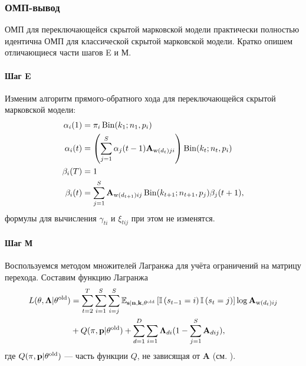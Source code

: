 \subsubsection{ОМП-вывод}

ОМП для переключающейся скрытой марковской модели практически полностью
идентична ОМП для классической скрытой марковской модели. Кратко опишем отличающиеся
части шагов E и М.

\paragraph{Шаг E}

Изменим алгоритм прямого-обратного хода для переключающейся скрытой
марковской модели:
\begin{align*}
  \alpha_i(1)
  &= \pi_i \operatorname{Bin}(k_1; n_1, p_i) \\
  \alpha_i(t)
  &= \left( \sum\limits_{j = 1}^S \alpha_j(t - 1) \mathbf{A}_{\operatorname{w}(d_t)ji}
     \right) \operatorname{Bin}(k_t; n_t, p_i) \\
  \beta_i(T)
  &= 1 \\
  \beta_i(t)
  &= \sum\limits_{j = 1}^S
     \mathbf{A}_{\operatorname{w}(d_{t+1})ij} \operatorname{Bin}(k_{t + 1}; n_{t + 1}, p_j) \beta_j(t + 1),
\end{align*}
формулы для вычисления $\gamma_{ti}$ и $\xi_{tij}$ при этом не изменятся.

\paragraph{Шаг М}

Воспользуемся методом множителей Лагранжа для учёта ограничений на матрицу перехода.
Составим функцию Лагранжа
\begin{align*}
  L(\mathbf{\theta}, \mathbf{\Lambda}|\mathbf{\theta}^{\operatorname{old}})
  &= \sum\limits_{t = 2}^T
     \sum\limits_{i = 1}^S \sum\limits_{i = j}^S
     \mathbb{E}_{\mathbf{s}|\mathbf{n}, \mathbf{k}, \mathbf{\theta}^{\operatorname{old}}} \left[ \mathbb{I}\left( s_{t - 1} = i \right)\mathbb{I}\left( s_t = j \right) \right] \log \mathbf{A}_{\operatorname{w}(d_t)ij} \\
  &+ Q(\mathbf{\pi}, \mathbf{p}|\mathbf{\theta}^{\operatorname{old}})
   + \sum\limits_{d = 1}^D \sum\limits_{i = 1}
     \mathbf{\Lambda}_{di} (1 - \sum\limits_{j = 1}^S \mathbf{A}_{dij}),
\end{align*}
где $Q(\mathbf{\pi}, \mathbf{p}|\mathbf{\theta}^{\operatorname{old}})$ --- часть
функции $Q$, не зависящая от $\mathbf{A}$ (см. \cite[c. 620]{murphy2012machine}).

